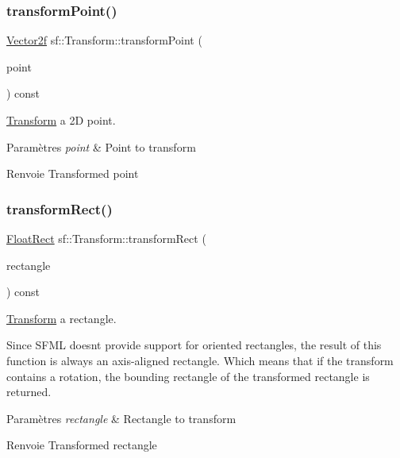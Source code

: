 \subsubsection{\texorpdfstring{transform\+Point()}{transformPoint()}\hspace{0.1cm}{\footnotesize\ttfamily [2/2]}}
{\footnotesize\ttfamily \hyperlink{classsf_1_1Vector2}{Vector2f} sf\+::\+Transform\+::transform\+Point (\begin{DoxyParamCaption}\item[{const \hyperlink{classsf_1_1Vector2}{Vector2f} \&}]{point }\end{DoxyParamCaption}) const}



\hyperlink{classsf_1_1Transform}{Transform} a 2D point. 


\begin{DoxyParams}{Paramètres}
{\em point} & Point to transform\\
\hline
\end{DoxyParams}
\begin{DoxyReturn}{Renvoie}
Transformed point 
\end{DoxyReturn}
\mbox{\label{classsf_1_1Transform_a3824a20505d81a94bc22be1ffee57d3d}} 
\subsubsection{\texorpdfstring{transform\+Rect()}{transformRect()}}
{\footnotesize\ttfamily \hyperlink{classsf_1_1Rect}{Float\+Rect} sf\+::\+Transform\+::transform\+Rect (\begin{DoxyParamCaption}\item[{const \hyperlink{classsf_1_1Rect}{Float\+Rect} \&}]{rectangle }\end{DoxyParamCaption}) const}



\hyperlink{classsf_1_1Transform}{Transform} a rectangle. 

Since S\+F\+ML doesn\textquotesingle{}t provide support for oriented rectangles, the result of this function is always an axis-\/aligned rectangle. Which means that if the transform contains a rotation, the bounding rectangle of the transformed rectangle is returned.


\begin{DoxyParams}{Paramètres}
{\em rectangle} & Rectangle to transform\\
\hline
\end{DoxyParams}
\begin{DoxyReturn}{Renvoie}
Transformed rectangle 
\end{DoxyReturn}
\mbox{\label{classsf_1_1Transform_ab54f6c8070cc05e2afcb3145fbf4395a}} 
